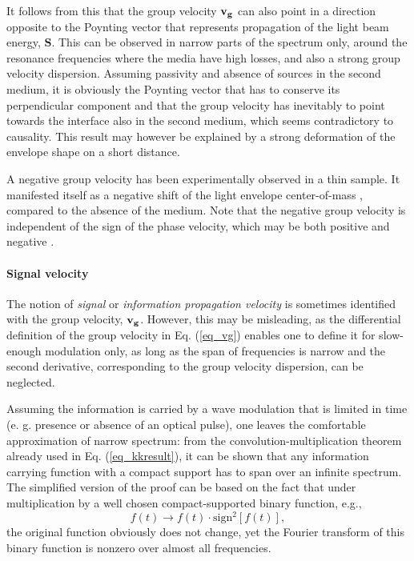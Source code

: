 It follows from this that the group velocity ${\mathbf{v_g}}$ can also point in a direction opposite to the Poynting vector that represents propagation of the light beam energy, $\mathbf{S}$. 
This can be observed in narrow parts of the spectrum only, around the resonance frequencies where the media have high losses, and also a strong group velocity dispersion.
Assuming passivity and absence of sources in the second medium, it is obviously the Poynting vector that has to conserve its perpendicular component and that the group velocity has inevitably to point towards the interface also in the second medium, which seems contradictory to causality.
This result 
may however be explained by a strong deformation of the envelope shape on a short distance. %

A negative group velocity has been experimentally observed in a thin sample. It manifested itself as a negative shift of the light envelope center-of-mass \cite{dolling2006simultaneous},  compared to the absence of the medium. Note that the negative group velocity is independent of the sign of the phase velocity, which may be both positive and negative \cite{mikki2009electromagnetic}. 

\paragraph{Signal velocity}%
The notion of \textit{signal} or \textit{information propagation velocity} is sometimes %
identified with the group velocity, ${\mathbf{v_g}}$. However, this may be misleading, as the differential definition of the group velocity in Eq. (\ref{eq_vg}) enables one to define it for slow-enough modulation only, as long as  the span of frequencies is narrow and the second derivative, corresponding to the group velocity dispersion, can be neglected.

Assuming the information is carried by a wave modulation that is limited in time (e. g. presence or absence of an optical pulse), one leaves the comfortable approximation of narrow spectrum: from the convolution-multiplication theorem already used in Eq. (\ref{eq_kkresult}), it can be shown that any information carrying function with a compact support has to span over an infinite spectrum. The simplified version of the proof \cite{hill2013uncertainty} can be based on the fact that under multiplication by a well chosen compact-supported binary function, e.g., 
$$ f(t) \rightarrow f(t) \cdot \mathrm{sign}^2[f(t)], $$
the original function obviously does not change, yet the Fourier transform of this binary function is nonzero over almost all frequencies. 

